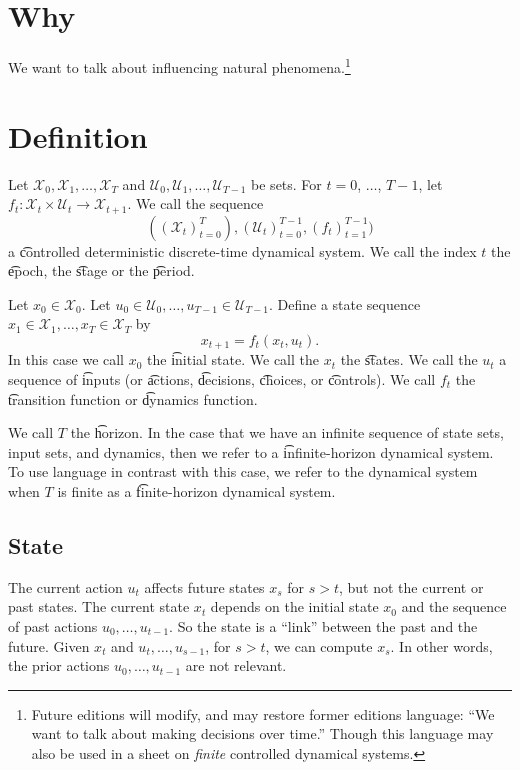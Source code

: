 
\section*{Why}

We want to talk about influencing natural phenomena.\footnote{Future editions will modify, and may restore former editions language: ``We want to talk about making decisions over time.''
Though this language may also be used in a sheet on \textit{finite} controlled dynamical systems.}

\section*{Definition}

Let $\mathcal{X} _0, \mathcal{X} _1, \dots , \mathcal{X} _{T}$ and $\mathcal{U} _0, \mathcal{U} _1, \dots , \mathcal{U} _{T-1}$ be sets.
For $t = 0$, $\dots $, $T-1$, let $f_{t}: \mathcal{X} _t \times \mathcal{U} _t \to \mathcal{X} _{t+1}$.
We call the sequence
\[
((\mathcal{X} _t)_{t = 0}^{T}), (\mathcal{U} _t)_{t=0}^{T-1}, (f_t)_{t=1}^{T-1})
\]
a \t{controlled deterministic discrete-time dynamical system}.
We call the index $t$ the \t{epoch}, the \t{stage} or the \t{period}.

Let $x_0 \in \mathcal{X} _0$.
Let $u_0 \in \mathcal{U} _0, \dots , u_{T-1} \in \mathcal{U} _{T-1}$. Define a state sequence $x_1 \in \mathcal{X} _1, \dots , x_T \in \mathcal{X} _T$ by
\[
x_{t+1} = f_t(x_t, u_t).
\]
In this case we call $x_0$ the \t{initial state}.
We call the $x_t$ the \t{states}.
We call the $u_t$ a sequence of \t{inputs} (or \t{actions}, \t{decisions}, \t{choices}, or \t{controls}).
We call $f_t$ the \t{transition function} or \t{dynamics function}.

We call $T$ the \t{horizon}.
In the case that we have an infinite sequence of state sets, input sets, and dynamics, then we refer to a \t{infinite-horizon} dynamical system.
To use language in contrast with this case, we refer to the dynamical system when $T$ is finite as a \t{finite-horizon} dynamical system.

\subsection*{State}

The current action $u_t$ affects future states $x_{s}$ for $s > t$, but not the current or past states.
The current state $x_t$ depends on the initial state $x_0$ and the sequence of past actions $u_0, \dots , u_{t-1}$.
So the state is a ``link'' between the past and the future.
Given $x_t$ and $u_t, \dots , u_{s-1}$, for $s > t$, we can compute $x_s$.
In other words, the prior actions $u_0, \dots , u_{t-1}$ are not relevant.

